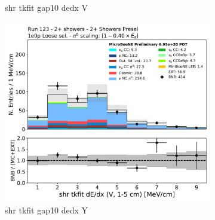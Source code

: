 \begin{figure}[H]
\begin{subfigure}{0.3\textwidth}
    \caption{shr tkfit gap10 dedx V}
    \end{subfigure}
    \begin{subfigure}{0.3\textwidth}
    \includegraphics[width=1.0\textwidth]{Sidebands/Figures/TwoShr_1e0pSel/loose/shr_tkfit_gap10_dedx_V.pdf}
    \caption{shr tkfit gap10 dedx Y}
    \end{subfigure}
    \caption{} 
    \label{fig:HE_1eNp_1}
\end{figure}

